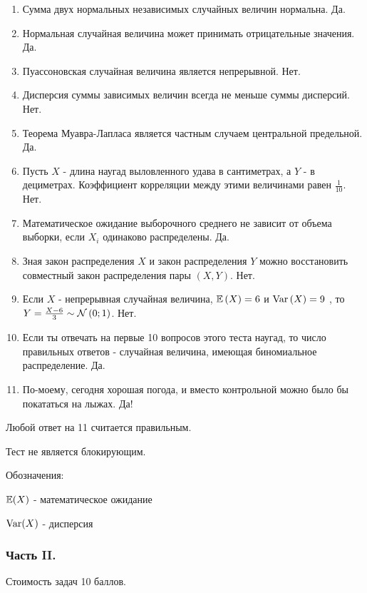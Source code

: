 \begin{enumerate}
\item Сумма двух нормальных независимых случайных величин нормальна.
Да.
\item Нормальная случайная величина может принимать отрицательные
значения. Да.
\item Пуассоновская случайная величина является непрерывной. Нет.
\item Дисперсия суммы зависимых величин всегда не меньше суммы
дисперсий. Нет.
\item Теорема Муавра-Лапласа является частным случаем центральной
предельной. Да.
\item Пусть $X$ - длина наугад выловленного удава в сантиметрах, а
$Y$ - в дециметрах. Коэффициент корреляции между этими
величинами равен $\frac{1}{10}$. Нет.
\item Математическое ожидание выборочного среднего не зависит от
объема выборки, если $X_{i}$ одинаково распределены. Да.
\item Зная закон распределения $X$ и закон распределения $Y$
можно восстановить совместный закон распределения пары $(X,Y)$. Нет.
\item Если  $X$  - непрерывная случайная величина,  $\mathbb{E}\left(X\right)=6$  и
$\operatorname{Var}\left(X\right)=9$ , то  $Y=\frac{X-6}{3} \sim
\mathcal{N}\left(0;1\right)$.  Нет.
\item Если ты отвечать на первые 10 вопросов этого теста наугад, то
число правильных ответов - случайная величина, имеющая
биномиальное распределение. Да.
\item По-моему, сегодня хорошая погода, и вместо контрольной можно
было бы покататься на лыжах. Да!
\end{enumerate}


Любой ответ на 11 считается правильным.

Тест не является блокирующим.

Обозначения:

$\mathbb{E}(X)$ - математическое ожидание

$\operatorname{Var}(X)$ - дисперсия

\subsubsection*{Часть II.}

Стоимость задач 10 баллов.

